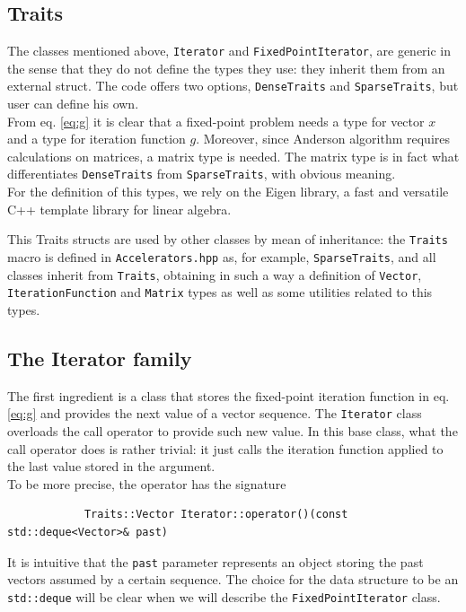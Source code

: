 \documentclass[12pt]{article}
\begin{document}
		\subsection{Traits}
		The classes mentioned above, \verb|Iterator| and \verb|FixedPointIterator|, are generic in the sense that
		they do not define the types they use: they inherit them from an external struct.
		The code offers two options, \verb|DenseTraits| and \verb|SparseTraits|, but user can define his own.\\
		From eq. \ref{eq:g} it is clear that a fixed-point problem needs a type for vector $x$ and a type for iteration function $g$.
		Moreover, since Anderson algorithm requires calculations on matrices, a matrix type is needed.
		The matrix type is in fact what differentiates \verb|DenseTraits| from \verb|SparseTraits|,
		with obvious meaning.\\
		For the definition of this types, we rely on the Eigen library, a fast and versatile
		C++ template library for linear algebra. 
		
		This Traits structs are used by other classes by mean of inheritance: the \verb|Traits| macro
		is defined in \verb|Accelerators.hpp| as, for example, \verb|SparseTraits|, and all classes inherit
		from \verb|Traits|, obtaining in such a way a definition of \verb|Vector|, \verb|IterationFunction| and \verb|Matrix| types
		as well as some utilities related to this types.
		
		
		\subsection{The Iterator family}
		The first ingredient is a class that stores the fixed-point iteration function in eq. \ref{eq:g} and provides the next value
		of a vector sequence. The \verb|Iterator| class overloads the call
		operator to provide such new value. In this base class, what the call operator does is rather trivial:
		it just calls the iteration function applied to the last value stored in the argument.\\
		To be more precise, the operator has the signature
		\begin{verbatim}
			Traits::Vector Iterator::operator()(const std::deque<Vector>& past)
		\end{verbatim}
		It is intuitive that the \verb|past| parameter represents an object storing the past vectors assumed by a certain sequence.
		The choice for the data structure to be an \verb|std::deque| will be clear when we will describe the \verb|FixedPointIterator| class.
		
\end{document}
